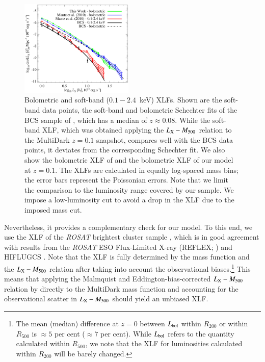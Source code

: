 \documentclass[useAMS,usenatbib]{mn2e}
\begin{document}
\begin{figure} 
\centering
\includegraphics[width=0.48\textwidth]{figures/xlf.eps}
\caption{Bolometric and soft-band ($0.1-2.4$~keV) XLFs. Shown are the soft-band
  data points, the soft-band and bolometric Schechter fits of the BCS sample of
  \protect\cite{1997ApJ...479L.101E}, which has a median of $z \approx 0.08$.
  While the soft-band XLF, which was obtained applying the
  \protect\cite{2010MNRAS.406.1773M} $L_{{\mathrm{X}}}-M_{500}$ relation to the
  MultiDark $z = 0.1$ snapshot, compares well with the BCS data points, it
  deviates from the corresponding Schechter fit. We also show the bolometric XLF
  of \protect\cite{2010MNRAS.406.1773M} and the bolometric XLF of our model at
  $z=0.1$. The XLFs are calculated in equally log-spaced mass bins; the error
  bars represent the Poissonian errors. Note that we limit the comparison to the
  luminosity range covered by our sample.  We impose a low-luminosity cut to
  avoid a drop in the XLF due to the imposed mass cut.}
\label{fig:XLF}
\end{figure}

Nevertheless, it provides a complementary check for our model. To this end, we
use the XLF of the \emph{ROSAT} brightest cluster sample
\citep[BCS][]{1997ApJ...479L.101E}, which is in good agreement with results from
the \emph{ROSAT} ESO Flux-Limited X-ray (REFLEX; \citealp{2002ApJ...566...93B})
and HIFLUGCS \citep{2002ApJ...567..716R}.  Note that the XLF is fully determined
by the mass function and the $L_{{\mathrm{X}}}-M_{500}$ relation after taking into
account the observational biases.\footnote{The mean (median) difference at $z=0$
  between $L_{{\mathrm{bol}}}$ within $R_{200}$ or within $R_{500}$ is $\approx 5$
  per cent ($\approx 7$ per cent). While $L_{{\mathrm{bol}}}$ refers to the quantity
  calculated within $R_{500}$, we note that the XLF for luminosities calculated
  within $R_{200}$ will be barely changed.} This means that applying the
Malmquist and Eddington-bias-corrected $L_{{\mathrm{X}}}-M_{500}$ relation by
\cite{2010MNRAS.406.1773M} directly to the MultiDark mass function and
accounting for the observational scatter in $L_{{\mathrm{X}}}-M_{500}$ should yield
an unbiased XLF.
\end{document}

